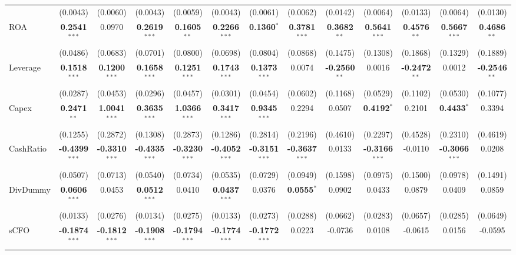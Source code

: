 \begin{landscape}
\begin{table}[H]
\begin{tabular}{lcccccccccccc}
 & (0.0043) & (0.0060) & (0.0043) & (0.0059) & (0.0043) & (0.0061) & (0.0062) & (0.0142) & (0.0064) & (0.0133) & (0.0064) & (0.0130) \\
ROA & \textbf{0.2541}$^{***}$ & 0.0970 & \textbf{0.2619}$^{***}$ & \textbf{0.1605}$^{**}$ & \textbf{0.2266}$^{***}$ & \textbf{0.1360}$^{*}$ & \textbf{0.3781}$^{***}$ & \textbf{0.3682}$^{**}$ & \textbf{0.5641}$^{***}$ & \textbf{0.4576}$^{**}$ & \textbf{0.5667}$^{***}$ & \textbf{0.4686}$^{**}$ \\
 & (0.0486) & (0.0683) & (0.0701) & (0.0800) & (0.0698) & (0.0804) & (0.0868) & (0.1475) & (0.1308) & (0.1868) & (0.1329) & (0.1889) \\
Leverage & \textbf{0.1518}$^{***}$ & \textbf{0.1200}$^{***}$ & \textbf{0.1658}$^{***}$ & \textbf{0.1251}$^{***}$ & \textbf{0.1743}$^{***}$ & \textbf{0.1373}$^{***}$ & 0.0074 & \textbf{-0.2560}$^{**}$ & 0.0016 & \textbf{-0.2472}$^{**}$ & 0.0012 & \textbf{-0.2546}$^{**}$ \\
 & (0.0287) & (0.0453) & (0.0296) & (0.0457) & (0.0301) & (0.0454) & (0.0602) & (0.1168) & (0.0529) & (0.1102) & (0.0530) & (0.1077) \\
Capex & \textbf{0.2471}$^{**}$ & \textbf{1.0041}$^{***}$ & \textbf{0.3635}$^{***}$ & \textbf{1.0366}$^{***}$ & \textbf{0.3417}$^{***}$ & \textbf{0.9345}$^{***}$ & 0.2294 & 0.0507 & \textbf{0.4192}$^{*}$ & 0.2101 & \textbf{0.4433}$^{*}$ & 0.3394 \\
 & (0.1255) & (0.2872) & (0.1308) & (0.2873) & (0.1286) & (0.2814) & (0.2196) & (0.4610) & (0.2297) & (0.4528) & (0.2310) & (0.4619) \\
CashRatio & \textbf{-0.4399}$^{***}$ & \textbf{-0.3310}$^{***}$ & \textbf{-0.4335}$^{***}$ & \textbf{-0.3230}$^{***}$ & \textbf{-0.4052}$^{***}$ & \textbf{-0.3151}$^{***}$ & \textbf{-0.3637}$^{***}$ & 0.0133 & \textbf{-0.3166}$^{***}$ & -0.0110 & \textbf{-0.3066}$^{***}$ & 0.0208 \\
 & (0.0507) & (0.0713) & (0.0540) & (0.0734) & (0.0535) & (0.0729) & (0.0949) & (0.1598) & (0.0975) & (0.1500) & (0.0978) & (0.1491) \\
DivDummy & \textbf{0.0606}$^{***}$ & 0.0453 & \textbf{0.0512}$^{***}$ & 0.0410 & \textbf{0.0437}$^{***}$ & 0.0376 & \textbf{0.0555}$^{*}$ & 0.0902 & 0.0433 & 0.0879 & 0.0409 & 0.0859 \\
 & (0.0133) & (0.0276) & (0.0134) & (0.0275) & (0.0133) & (0.0273) & (0.0288) & (0.0662) & (0.0283) & (0.0657) & (0.0285) & (0.0649) \\
sCFO & \textbf{-0.1874}$^{***}$ & \textbf{-0.1812}$^{***}$ & \textbf{-0.1908}$^{***}$ & \textbf{-0.1794}$^{***}$ & \textbf{-0.1774}$^{***}$ & \textbf{-0.1772}$^{***}$ & 0.0223 & -0.0736 & 0.0108 & -0.0615 & 0.0156 & -0.0595 \\

\end{tabular}
\end{table}
\end{landscape}
